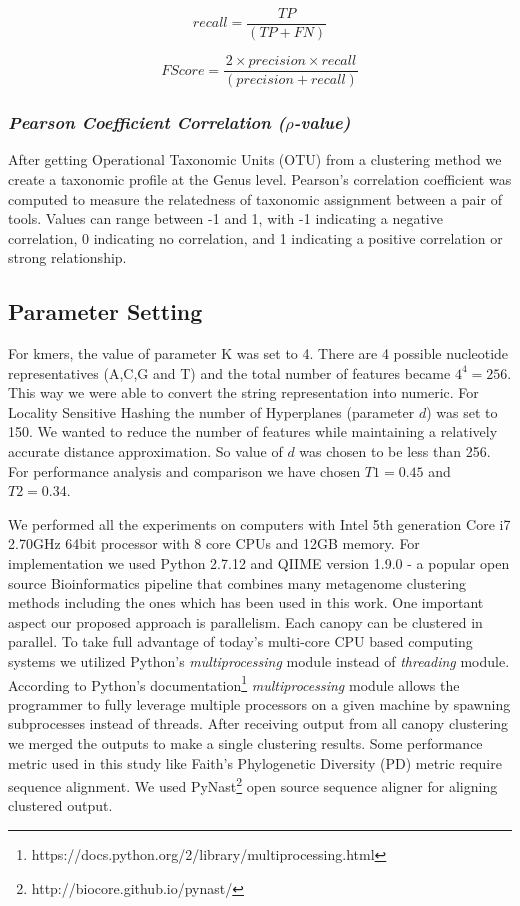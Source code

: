 \documentclass[10pt, conference, compsocconf]{IEEEtran}
\begin{document}
\begin{equation}
recall = \frac{TP}{(TP + FN)}
\end{equation}

\begin{equation}
F Score = \frac{2 \times precision \times recall}{(precision + recall)}
\end{equation}

\subsubsection{\textit{Pearson Coefficient Correlation ($\rho$-value)}}
After getting Operational Taxonomic Units (OTU) from a clustering method we create a taxonomic profile at the Genus level. Pearson’s correlation coefficient was computed to measure the relatedness of taxonomic assignment between a pair of tools. Values can range between -1 and 1, with -1 indicating a negative correlation, 0 indicating no correlation, and 1 indicating a positive correlation or strong relationship.


\subsection{\textbf{Parameter Setting}}

For kmers, the value of parameter K was set to 4. There are 4 possible nucleotide representatives (A,C,G and T) and the total number of features became $4^4=256$. This way we were able to convert the string representation into numeric. For Locality Sensitive Hashing the number of Hyperplanes (parameter $d$) was set to 150. We wanted to reduce the number of features while maintaining a relatively accurate distance approximation. So value of $d$ was chosen to be less than 256. For performance analysis and comparison we have chosen $T1=0.45$ and $T2=0.34$.         

We performed all the experiments on computers with Intel 5th generation Core i7 2.70GHz 64bit processor with 8 core CPUs and 12GB memory. For implementation we used Python 2.7.12 and QIIME \cite{MARQiime} version 1.9.0 - a popular open source Bioinformatics pipeline that combines many metagenome clustering methods including the ones which has been used in this work. One important aspect our proposed approach is parallelism. Each canopy can be clustered in parallel. To take full advantage of today's multi-core CPU based computing systems we utilized Python's \textit{multiprocessing} module instead of \textit{threading} module. According to Python's documentation\footnote{https://docs.python.org/2/library/multiprocessing.html} \textit{multiprocessing} module allows the programmer to fully leverage multiple processors on a given machine by spawning subprocesses instead of threads. After receiving output from all canopy clustering we merged the outputs to make a single clustering results. Some performance metric used in this study like Faith’s Phylogenetic Diversity (PD) metric require sequence alignment. We used PyNast\footnote{http://biocore.github.io/pynast/} \cite{MARPynast} open source sequence aligner for aligning clustered output.    
\end{document}
